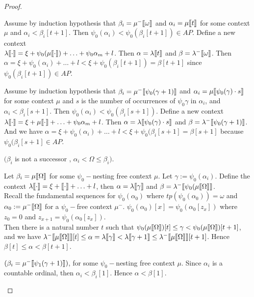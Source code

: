 \documentclass{amsart}
\theoremstyle{plain}
\theoremstyle{plain}
\def\scbrl{[\hspace{-.14em}[}
\def\scbrr{]\hspace{-.14em}]}
\def\scbr#1{\scbrl#1\scbrr}
\newcommand{\Om}{{\Omega}}
\newcommand{\al}{{\alpha}}
\newcommand{\be}{{\beta}}
\newcommand{\ga}{\gamma}
\newcommand{\la}{\lambda}
\newcommand{\om}{\omega}
\def\scbrl{[\hspace{-.14em}[}
\def\scbrr{]\hspace{-.14em}]}
\def\scbr#1{\scbrl#1\scbrr}
\begin{document}
\begin{proof}
\begin{Cases}
\begin{Cases}
        \item Assume by induction hypothesis that $\be_i = \mu^-\scbr{\om}$ and  $\al_i=\mu\scbr{t}$ for some context $\mu$ and $\al_i<\be_i[t+1]$.
        Then $\psi_0(\al_i)<\psi_0(\be_i[t+1])\in AP$.
        Define a new context\\
        $\la\scbr{\cdot} = \xi + \psi_0({\mu\scbr{\cdot}}) +\ldots+ \psi_0{\al_m}+l$. Then $\al= \la\scbr{t}$ and $\be=\la^-\scbr{\om}$.
        Then $\al= \xi +\psi_0(\al_i)+\ldots+l<\xi + \psi_0(\be_i[t+1]) =\be[t+1]$ since $\psi_0(\be_i[t+1]) \in AP$.
        \medskip
        
        \item Assume by induction hypothesis that $\be_i=\mu^-\scbr{\psi_0(\ga+1)}$ and $\al_i = \mu\scbr{\psi_0(\ga)\cdot s}$  for some context $\mu$ and $s$ is the number of occurrences of $\psi_0\ga$ in $\al_i$, and $\al_i<\be_i[s+1]$. 
        Then $\psi_0(\al_i) <\psi_0(\be_i[s+1])$.
        Define a new context\\
        $\la\scbr{\cdot} = \xi+ {\mu\scbr{\cdot}} + \ldots+ \psi_0{\al_m}+l$. Then $\al= \la\scbr{\psi_0(\ga)\cdot s}$ and $\be= \la^-\scbr{\psi_0(\ga+1)}$.
        And we have $\al =\xi + \psi_0(\al_i)+\ldots+l<\xi+\psi_0(\be_i[s+1] =\be[s+1]$ because $\psi_0(\be_i[s+1] \in AP$.
    \end{Cases}
    
    \item $(\be_i$ is not a successor \label{case:beiNotSucc}, $ \al_i<\Om \leq \be_i)$.
    \begin{Cases}
    \item Let $\be_i= \mu\scbr{\Om}$ for some $\psi_0-$nesting free context $\mu$.
    Let $\ga := \psi_0(\al_i)$.	Define the context
    $\la\scbr{\cdot} = \xi+\scbr{\cdot}+ \ldots + l$, then  $\al = \la\scbr{\ga}$ and $\be = \la^-\scbr{\psi_0(\mu\scbr{\Om}}$.
    \\
    Recall the fundamental sequences for $\psi_0(\al_0)$ where $tp(\psi_0(\al_0))=\om$ and $\al_0 :=\mu^-\scbr{\Om}$ for a $\psi_0-$free context $\mu^-$.
    $\psi_0(\al_0)[x] = \psi_0(\al_0[z_x])$ where $z_0=0$ and $z_{x+1}= \psi_0(\al_0[z_x])$.
    \\
    Then there is a natural number $t$ such that $\psi_0(\mu\scbr{\Om})[t] \leq \ga < \psi_0(\mu\scbr{\Om})[t+1]$,
    and we have
    $  \la^-\scbr{\mu\scbr{\Om}}[t] \leq \al = \la\scbr{\ga} < \la\scbr{\ga+1} \leq \la^-\scbr{\mu\scbr{\Om}}[t+1]$. 
    Hence $\be[t] \leq \al < \be[{t+1}]$.\medskip

    \item $(\be_i= \mu^-\scbr{\psi_1(\ga+1)})$, for some  $\psi_0-$nesting free context $\mu$. Since $\al_i$ is a countable ordinal, then $\al_i<\be_i[1]$. Hence $\al<\be[1]$.\medskip
    

\end{Cases}
\end{Cases}
\end{proof}
\end{document}
